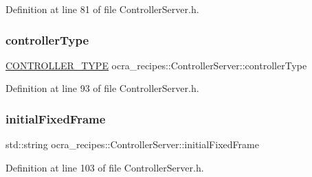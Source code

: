 Definition at line 81 of file Controller\+Server.\+h.

\hypertarget{classocra__recipes_1_1ControllerServer_aaf53114a96960a3cb81577378c179411}{}\label{classocra__recipes_1_1ControllerServer_aaf53114a96960a3cb81577378c179411} 
\subsubsection{\texorpdfstring{controller\+Type}{controllerType}}
{\footnotesize\ttfamily \hyperlink{namespaceocra__recipes_ae561cff4ea9a191b8b1ebb4e69a1a4ba}{C\+O\+N\+T\+R\+O\+L\+L\+E\+R\+\_\+\+T\+Y\+PE} ocra\+\_\+recipes\+::\+Controller\+Server\+::controller\+Type\hspace{0.3cm}{\ttfamily [protected]}}



Definition at line 93 of file Controller\+Server.\+h.

\hypertarget{classocra__recipes_1_1ControllerServer_a93ffe0eff924223989db0ae6fcafaca2}{}\label{classocra__recipes_1_1ControllerServer_a93ffe0eff924223989db0ae6fcafaca2} 
\subsubsection{\texorpdfstring{initial\+Fixed\+Frame}{initialFixedFrame}}
{\footnotesize\ttfamily std\+::string ocra\+\_\+recipes\+::\+Controller\+Server\+::initial\+Fixed\+Frame\hspace{0.3cm}{\ttfamily [protected]}}



Definition at line 103 of file Controller\+Server.\+h.

\hypertarget{classocra__recipes_1_1ControllerServer_a46e53b5a5bf9f7d55af477f85cb21522}{}\label{classocra__recipes_1_1ControllerServer_a46e53b5a5bf9f7d55af477f85cb21522} 
